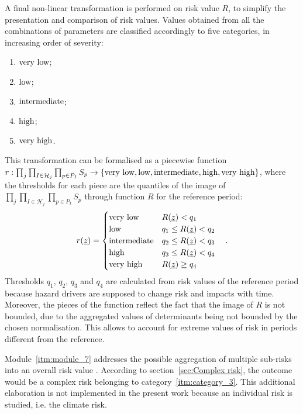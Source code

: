 A final non-linear transformation is performed on \gls{risk} value $R$, to simplify the presentation and comparison of \gls{risk} values.
Values obtained from all the combinations of parameters are classified accordingly to five categories, in increasing order of severity:\cite[53]{2017GIZRiskSupplement}
\begin{enumerate}
  \item $\text{very low}$;
  \item $\text{low}$;
  \item $\text{intermediate}$;
  \item $\text{high}$;
  \item $\text{very high}$.
\end{enumerate}
This transformation can be formalised as a piecewise function $r : \prod_j \prod_{I \in \mathcal{H}_j} \prod_{p \in P_I} S_p \to \{ \text{very low}, \text{low}, \text{intermediate}, \text{high}, \text{very high} \}$, where the thresholds for each piece are the quantiles of the image of $\prod_j \prod_{I \in \mathcal{H}_j} \prod_{p \in P_I} S_p$ through function $R$ for the reference period:
\begin{equation}
  \label{eq:risk_categorical}
  r(\underline{z}) =
  \begin{cases}
    \text{very low} & R(\underline{z}) < q_1 \\
    \text{low} & q_1 \le R(\underline{z}) < q_2 \\
    \text{intermediate} & q_2 \le R(\underline{z}) < q_3 \\
    \text{high} & q_3 \le R(\underline{z}) < q_4 \\
    \text{very high} & R(\underline{z}) \ge q_4
  \end{cases}
  \quad .
\end{equation}
Thresholds $q_1$, $q_2$, $q_3$ and $q_4$ are calculated from \gls{risk} values of the reference period because \gls{hazard} \glspl{driver} are supposed to change \gls{risk} and \glspl{impact} with time. Moreover, the pieces of the function reflect the fact that the image of $R$ is not bounded, due to the aggregated values of \glspl{determinant} being not bounded by the chosen normalisation. This allows to account for extreme values of \gls{risk} in periods different from the reference.

Module~\ref{itm:module_7} addresses the possible aggregation of multiple sub-risks into an overall \gls{risk} value \cite[54]{2017GIZRiskSupplement}. According to section~\ref{sec:Complex risk}, the outcome would be a complex risk belonging to category~\ref{itm:category_3}.
This additional elaboration is not implemented in the present work because an individual \gls{risk} is studied, i.e. the climate risk.
